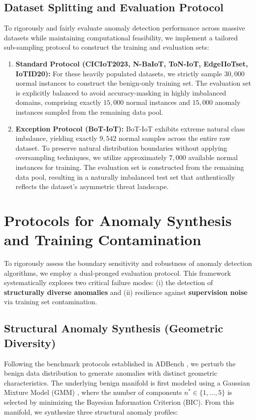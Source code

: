 \documentclass[final,twocolumn,10pt]{elsarticle}
\begin{document}
\subsection{Dataset Splitting and Evaluation Protocol}
To rigorously and fairly evaluate anomaly detection performance across massive datasets while maintaining computational feasibility, we implement a tailored sub-sampling protocol to construct the training and evaluation sets:
\begin{enumerate}
    \item \textbf{Standard Protocol (CICIoT2023, N-BaIoT, ToN-IoT, EdgeIIoTset, IoTID20):} For these heavily populated datasets, we strictly sample $30{,}000$ normal instances to construct the benign-only training set. The evaluation set is explicitly balanced to avoid accuracy-masking in highly imbalanced domains, comprising exactly $15{,}000$ normal instances and $15{,}000$ anomaly instances sampled from the remaining data pool.
    \item \textbf{Exception Protocol (BoT-IoT):} BoT-IoT exhibits extreme natural class imbalance, yielding exactly $9{,}542$ normal samples across the entire raw dataset. To preserve natural distribution boundaries without applying oversampling techniques, we utilize approximately $7{,}000$ available normal instances for training. The evaluation set is constructed from the remaining data pool, resulting in a naturally imbalanced test set that authentically reflects the dataset's asymmetric threat landscape.
\end{enumerate}


\section{Protocols for Anomaly Synthesis and Training Contamination}
\label{ap:anomaly_generation}

To rigorously assess the boundary sensitivity and robustness of anomaly detection algorithms, we employ a dual-pronged evaluation protocol. This framework systematically explores two critical failure modes: (i) the detection of \textbf{structurally diverse anomalies} and (ii) resilience against \textbf{supervision noise} via training set contamination.

\subsection{Structural Anomaly Synthesis (Geometric Diversity)}
Following the benchmark protocols established in ADBench \cite{han2022adbench}, we perturb the benign data distribution to generate anomalies with distinct geometric characteristics. The underlying benign manifold is first modeled using a Gaussian Mixture Model (GMM) \cite{GMM}, where the number of components $n^* \in \{1, \dots, 5\}$ is selected by minimizing the Bayesian Information Criterion (BIC). From this manifold, we synthesize three structural anomaly profiles:
\end{document}
